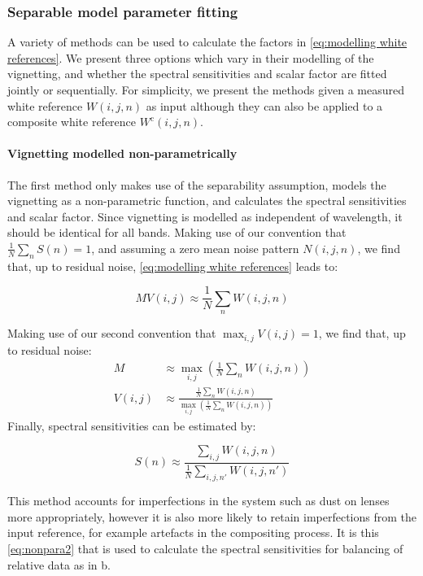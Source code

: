  

\subsubsection{Separable model parameter fitting}
\label{algorithmparameters}
A variety of methods can be used to calculate the factors in \eqref{eq:modelling white references}. We present three options which vary in their modelling of the vignetting, and whether the spectral sensitivities and scalar factor are fitted jointly or sequentially. For simplicity, we present the methods given a measured white reference $W(i,j,n)$ as input although they can also be applied to a composite white reference $W^{\textrm{c}}(i,j,n)$.

\paragraph{Vignetting modelled non-parametrically}
The first method only makes use of the separability assumption, models the vignetting as a non-parametric function, and calculates the spectral sensitivities and scalar factor. Since vignetting is modelled as independent of wavelength, it should be identical for all bands.
Making use of our convention that $\frac{1}{N} \sum_{n}S(n) = 1$, and assuming a zero mean noise pattern $N(i,j,n)$, we find that, up to residual noise, \eqref{eq:modelling white references} leads to:
%
%
\begin{linenomath*}
\begin{equation}
	M V(i,j) \approx \frac{1}{N}\sum_{n} W(i,j,n)
\label{eq:nonpara1}
\end{equation} 
\end{linenomath*}
%
Making use of our second convention that $\max_{i,j}V(i,j) = 1$, we find that, up to residual noise:
\begin{align}
	M &\approx \max_{i,j}\left( \frac{1}{N}\sum_{n} W(i,j,n) \right) \\
	V(i,j) &\approx \frac{ \frac{1}{N}\sum_{n} W(i,j,n) }{ \max_{i,j}\left( \frac{1}{N}\sum_{n} W(i,j,n) \right) }
\end{align} 
%
Finally, spectral sensitivities can be estimated by:
%
%
%	
%
%
\begin{linenomath*}
\begin{equation}
	S(n) \approx \frac{\sum_{i,j}W(i,j,n)}{\frac{1}{N}\sum_{i,j,n'}W(i,j,n')}
\label{eq:nonpara2}
\end{equation}
\end{linenomath*}
%
This method accounts for imperfections in the system such as dust on lenses more appropriately, however it is also more likely to retain imperfections from the input reference, for example artefacts in the compositing process. It is this \eqref{eq:nonpara2} that is used to calculate the spectral sensitivities for balancing of relative data as in b.

